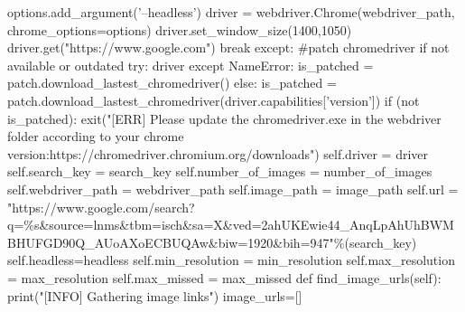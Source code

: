 \documentclass[10pt]{article} %
\begin{document}
\begin{spacing}{1.5}
options.add\_argument('--headless')         \newline
driver = webdriver.Chrome(webdriver\_path, chrome\_options=options) 
\newline 
driver.set\_window\_size(1400,1050)               \newline driver.get("https://www.google.com")     \newline
break       \newline
except:         \newline
\#patch chromedriver if not available or outdated       \newline
try:            \newline
driver      \newline
except NameError:           \newline
is\_patched = patch.download\_lastest\_chromedriver()       \newline
else:            \newline
is\_patched = patch.download\_lastest\_chromedriver(driver.capabilities['version'])         \newline
if (not is\_patched):           \newline
exit("[ERR] Please update the chromedriver.exe in the webdriver folder according to your chrome version:https://chromedriver.chromium.org/downloads")            \newline
self.driver = driver    \newline
self.search\_key = search\_key      \newline
self.number\_of\_images = number\_of\_images    \newline
self.webdriver\_path = webdriver\_path      \newline
self.image\_path = image\_path      \newline
self.url = "https://www.google.com/search?q=\%s\&source=lnms\&tbm=isch\&sa=X\&ved=2ahUKEwie44\_AnqLpAhUhBWMBHUFGD90Q\_AUoAXoECBUQAw\&biw=1920\&bih=947"\%(search\_key)  \newline
self.headless=headless  \newline
self.min\_resolution = min\_resolution  \newline
self.max\_resolution = max\_resolution  \newline
self.max\_missed = max\_missed      \newline
def find\_image\_urls(self):\textit{        }print("[INFO] Gathering image links")     \newline
image\_urls=[]  \newline

\end{spacing}
\end{document}
